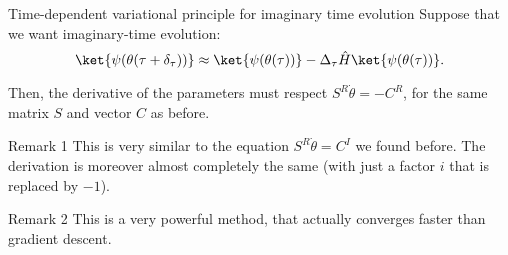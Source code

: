\documentclass[a4paper]{article}
\begin{document}
\begin{parag}{Time-dependent variational principle for imaginary time evolution}
    Suppose that we want imaginary-time evolution:
    \[\ket{\psi\left(\theta\left(\tau + \delta_{\tau}\right)\right)} \approx \ket{\psi\left(\theta\left(\tau\right)\right)} - \Delta_{\tau} \hat{H} \ket{\psi\left(\theta\left(\tau\right)\right)}.\]

    Then, the derivative of the parameters must respect $S^R \dot{\theta} = -C^R$, for the same matrix $S$ and vector $C$ as before.

    \begin{subparag}{Remark 1}
        This is very similar to the equation $S^R \dot{\theta} = C^I$ we found before. The derivation is moreover almost completely the same (with just a factor $i$ that is replaced by $-1$).
    \end{subparag}

    \begin{subparag}{Remark 2}
        This is a very powerful method, that actually converges faster than gradient descent.
    \end{subparag}
\end{parag}
\end{document}
